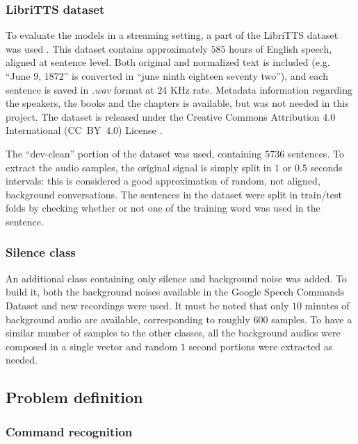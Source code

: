\subsubsection{LibriTTS dataset}

To evaluate the models in a streaming setting, a part of the LibriTTS dataset
was used \cite{zen2019libritts}. This dataset contains approximately $585$
hours of English speech, aligned at sentence level.
%
Both original and normalized text is included (e.g. ``June $9$, $1872$'' is
converted in ``june ninth eighteen seventy two''), and each sentence is saved
in \textit{.wav} format at $24$ KHz rate.
%
Metadata information regarding the speakers, the books and the chapters is
available, but was not needed in this project. The dataset is released under
the Creative Commons Attribution $4.0$ International (CC~BY~$4.0$) License
\cite{ccby4}.

The ``dev-clean'' portion of the dataset was used, containing $5736$ sentences.
To extract the audio samples, the original signal is simply split in $1$ or
$0.5$ seconds intervals: this is considered a good approximation of random, not
aligned, background conversations. The sentences in the dataset were split in
train/test folds by checking whether or not one of the training word was used
in the sentence.

\subsubsection{Silence class}

An additional class containing only silence and background noise was added. To
build it, both the background noises available in the Google Speech Commands
Dataset and new recordings were used.
%
It must be noted that only $10$ minutes of background audio are available,
corresponding to roughly $600$ samples.
%
To have a similar number of samples to the other classes, all the background
audios were composed in a single vector and random $1$ second portions were
extracted as needed.

\subsection{Problem definition}

\subsubsection{Command recognition}

